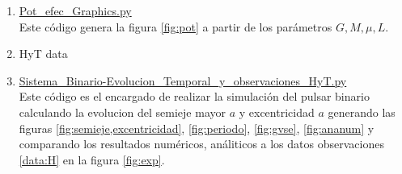 \begin{enumerate}
    \item \href{https://github.com/giovannilopez9808/Notas_Agosto_2020/blob/master/RG/Proyecto_final/Documento/Scripts/Pot_efec_Graphics.py}{Pot\_efec\_Graphics.py\label{cod:potefe}}\\
    Este código genera la figura \ref{fig:pot} a partir de los parámetros $G,M,\mu,L$.
    \item HyT data \label{data:H}
    \item \href{https://github.com/giovannilopez9808/Notas_Agosto_2020/blob/master/RG/Proyecto_final/Documento/Scripts/Sistema_Binario-Evolucion_Temporal_y_observaciones_HyT.py}{Sistema\_Binario-Evolucion\_Temporal\_y\_observaciones\_HyT.py\label{cod:evo}}\\
    Este código es el encargado de realizar la simulación del pulsar binario calculando la evolucion del semieje mayor $a$ y excentricidad $a$ generando las figuras \ref{fig:semieje,excentricidad}, \ref{fig:periodo}, \ref{fig:gvse}, \ref{fig:ananum} y comparando los resultados numéricos, análiticos a los datos observaciones 
    \ref{data:H} en la figura \ref{fig:exp}.
\end{enumerate}